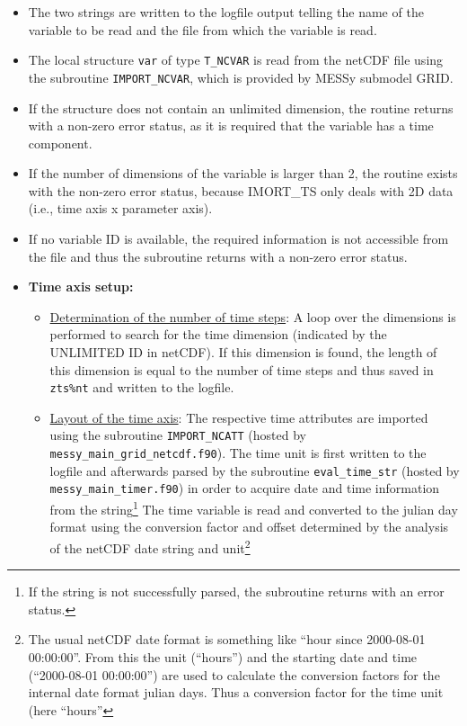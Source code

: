 \documentclass[11pt,twoside]{report}
\begin{document}
\begin{itemize}
\item The two strings are written to the logfile output telling the name of
 the variable to be read and the file from which the variable is read.
\item The local structure \verb|var| of type \verb|T_NCVAR| is read from 
the netCDF file using the subroutine
\verb|IMPORT_NCVAR|, which is provided by MESSy submodel GRID.
 \item If the structure does not contain an unlimited dimension, the
 routine returns with a non-zero error status, as it is required that
 the variable has a time component. 
\item If the number of dimensions of the variable is larger than 2,
 the routine exists with the non-zero error status, 
 because IMORT\_TS only deals with 2D data 
(i.e., time axis x parameter axis).
\item  If no variable ID is 
available, the required information is not accessible from the file and thus
the subroutine returns with a non-zero error status.
\item {\bf Time axis setup:}
\begin{itemize}
\item \underline{Determination of the number of time steps}: A loop over the
dimensions is performed to search for the time dimension (indicated by
the UNLIMITED ID in netCDF). 
If this dimension is found, the length of this
dimension is equal to the number of time steps and thus saved in \verb|zts%nt|
and written to the logfile.
\item \underline{Layout of the time axis}: The respective time
attributes are imported using the subroutine 
\verb|IMPORT_NCATT| (hosted by \verb|messy_main_grid_netcdf.f90|).
The time unit is first written to the logfile and afterwards parsed by the 
subroutine \verb|eval_time_str| (hosted by \verb|messy_main_timer.f90|)
in order to acquire date and time information from the string\footnote{If the string is not successfully parsed, the subroutine returns with an error
status.}
The time variable is read and converted to the julian day format
using the conversion factor and offset determined by the analysis of the netCDF
date string and unit\footnote{The usual netCDF date format is
something like ``hour since 2000-08-01 00:00:00''. From this the unit
(``hours'') and the starting date and time (``2000-08-01 00:00:00'') 
are used to calculate the conversion factors for the internal date
format julian days. Thus a conversion factor for the time unit (here ``hours''
}
\end{itemize}
\end{itemize}
\end{document}
